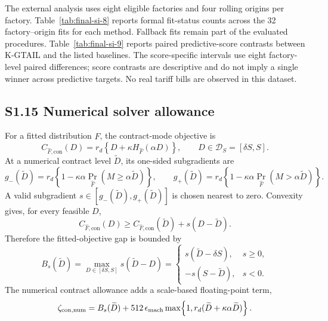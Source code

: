 \documentclass[AMA,Times1COL]{WileyNJDv5}
\begin{document}
The external analysis uses eight eligible factories and four rolling
origins per factory. Table~\ref{tab:final-si-8} reports formal fit-status
counts across the 32 factory--origin fits for each method. Fallback fits
remain part of the evaluated procedures. Table~\ref{tab:final-si-9}
reports paired predictive-score contrasts between K-GTAIL and the listed
baselines. The score-specific intervals use eight factory-level paired
differences; score contrasts are descriptive and do not imply a single
winner across predictive targets. No real tariff bills are observed in
this dataset.


\subsection*{S1.15 Numerical solver allowance}

For a fitted distribution $\widehat F$, the contract-mode objective is
\[
C_{\widehat F,\mathrm{con}}(D)
=r_d\left\{D+\kappa H_{\widehat F}(\alpha D)\right\},
\qquad D\in\mathcal D_S=[\delta S,S].
\]
At a numerical contract level $\widetilde D$, its one-sided
subgradients are
\[
g_-(\widetilde D)
=r_d\left\{1-\kappa\alpha\Pr_{\widehat F}(M\geq\alpha\widetilde D)\right\},
\qquad
g_+(\widetilde D)
=r_d\left\{1-\kappa\alpha\Pr_{\widehat F}(M>\alpha\widetilde D)\right\}.
\]
A valid subgradient $s\in[g_-(\widetilde D),g_+(\widetilde D)]$ is
chosen nearest to zero. Convexity gives, for every feasible $D$,
\[
C_{\widehat F,\mathrm{con}}(D)
\geq
C_{\widehat F,\mathrm{con}}(\widetilde D)
+s(D-\widetilde D).
\]
Therefore the fitted-objective gap is bounded by
\[
B_s(\widetilde D)
=\max_{D\in[\delta S,S]}s(\widetilde D-D)
=\begin{cases}
s(\widetilde D-\delta S),&s\geq0,\\
-s(S-\widetilde D),&s<0.
\end{cases}
\]
The numerical contract allowance adds a scale-based floating-point
term,
\[
\zeta_{\mathrm{con,num}}
=B_s(\widetilde D)
+512\,\epsilon_{\rm mach}
\max\!\left\{1,
 r_d(\widetilde D+\kappa\alpha\widetilde D)\right\}.
\]
\end{document}
